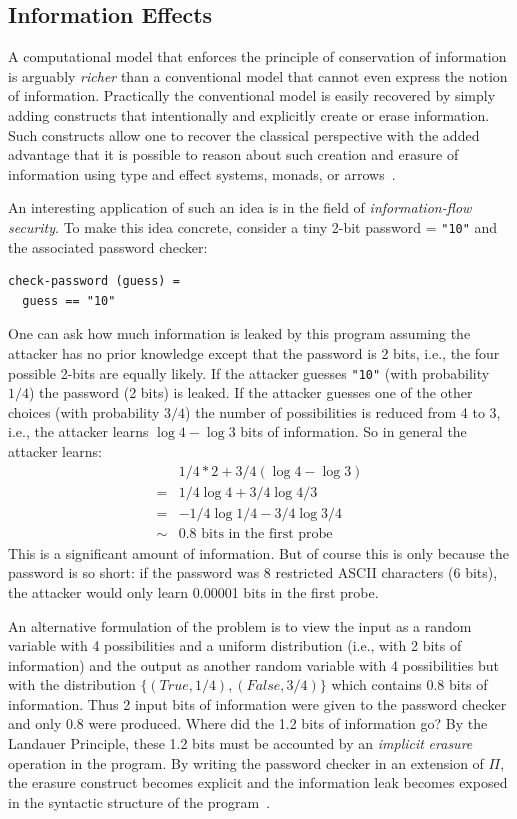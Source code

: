 \documentclass{article}
\begin{document}
\subsection{Information Effects}
 
A computational model that enforces the principle of conservation of
information is arguably \emph{richer} than a conventional model that
cannot even express the notion of information. Practically the
conventional model is easily recovered by simply adding constructs
that intentionally and explicitly create or erase information. Such
constructs allow one to recover the classical perspective with the
added advantage that it is possible to reason about such creation and
erasure of information using type and effect systems, monads, or
arrows~\cite{infeffects,inversearrows}. 

An interesting application of such an idea is in the field of
\emph{information-flow security}. To make this idea concrete, consider
a tiny 2-bit password = \verb|"10"| and the associated password checker:

\begin{verbatim}
check-password (guess) =
  guess == "10"
\end{verbatim}

One can ask how much information is leaked by this program assuming
the attacker has no prior knowledge except that the password is 2
bits, i.e., the four possible 2-bits are equally likely. If the
attacker guesses \verb|"10"| (with probability $1/4$) the password (2
bits) is leaked. If the attacker guesses one of the other choices
(with probability $3/4$) the number of possibilities is reduced from 4
to 3, i.e., the attacker learns $\log{4} - \log{3}$ bits of
information. So in general the attacker learns:
\[\begin{array}{ll}
   &  1/4 * 2 + 3/4 (\log{4} - \log{3}) \\
  =&  1/4 \log{4} + 3/4 \log{4/3} \\
  =&  - 1/4 \log{1/4} - 3/4 \log{3/4} \\
  \sim& 0.8 \mbox{~bits~in~the~first~probe}
\end{array}\]
This is a significant amount of information. But of course this is
only because the password is so short: if the password was 8
restricted ASCII characters (6 bits), the attacker would only learn
0.00001 bits in the first probe.

An alternative formulation of the problem is to view the input as a
random variable with 4 possibilities and a uniform distribution (i.e.,
with 2 bits of information) and the output as another random variable
with 4 possibilities but with the distribution
$\{ (\mathit{True}, 1/4), (\mathit{False}, 3/4) \}$ which contains 0.8 bits of
information. Thus 2 input bits of information were given to the
password checker and only 0.8 were produced. Where did the 1.2 bits of
information go? By the Landauer Principle, these 1.2 bits must be
accounted by an \emph{implicit} \emph{erasure} operation in the
program. By writing the password checker in an extension of $\Pi$, the
erasure construct becomes explicit and the information leak becomes
exposed in the syntactic structure of the program~\cite{infeffects}.
\end{document}
